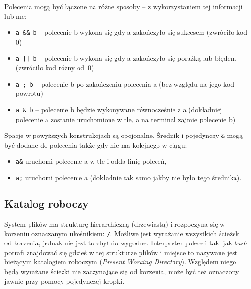 Polecenia mogą być łączone na różne sposoby – z wykorzystaniem tej informacji lub nie:
\begin{itemize}
	\item \Verb$a && b$ – polecenie b wykona się gdy a zakończyło się sukcesem (zwróciło kod 0)
	\item \Verb$a || b$ – polecenie b wykona się gdy a zakończyło się porażką lub błędem (zwróciło kod różny od~0)
	\item \Verb$a ; b$ – polecenie b po zakończeniu polecenia a (bez względu na jego kod powrotu)
	\item \Verb$a & b$ – polecenie b będzie wykonywane równocześnie z a (dokładniej polecenie a zostanie uruchomione w tle, a na terminal zajmie polecenie b)
\end{itemize}

Spacje w powyższych konstrukcjach są opcjonalne.
Średnik i pojedynczy \Verb$&$ mogą być dodane do polecenia także gdy nie ma kolejnego w ciągu:
\begin{itemize}
	\item \Verb$a&$ uruchomi polecenie a w tle i odda linię poleceń,
	\item \Verb$a;$ uruchomi polecenie a (dokładnie tak samo jakby nie było tego średnika).
\end{itemize}

\subsection{Katalog roboczy}

System plików ma strukturę hierarchiczną (drzewiastą) i rozpoczyna się w korzeniu oznaczanym ukośnikiem: \texttt{/}.
Możliwe jest wyrażanie wszystkich ścieżek od korzenia, jednak nie jest to zbytnio wygodne.
Interpreter poleceń taki jak \textit{bash} potrafi znajdować się gdzieś w tej strukturze plików i miejsce to nazywane jest bieżącym katalogiem roboczym (\textit{Present Working Directory}).
Względem niego będą wyrażane ścieżki nie zaczynające się od korzenia, może być też oznaczony jawnie przy pomocy pojedynczej kropki.

